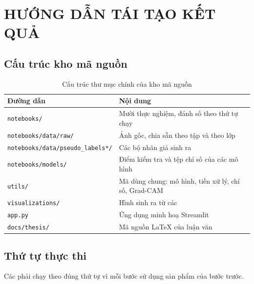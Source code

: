\chapter{HƯỚNG DẪN TÁI TẠO KẾT QUẢ}
\label{app:D}

\section{Cấu trúc kho mã nguồn}

\begin{table}[H]
\centering
\caption{Cấu trúc thư mục chính của kho mã nguồn}
\label{tab:app_repo}
\begin{tabular}{L{5.2cm} L{7.8cm}}
\toprule
\textbf{Đường dẫn} & \textbf{Nội dung} \\
\midrule
\texttt{notebooks/} & Mười  thực nghiệm, đánh số theo thứ tự chạy \\
\texttt{notebooks/\allowbreak data/\allowbreak raw/} & Ảnh gốc, chia sẵn theo tập và theo lớp \\
\texttt{notebooks/\allowbreak data/\allowbreak pseudo\_\allowbreak labels*/} & Các bộ nhãn giả sinh ra \\
\texttt{notebooks/\allowbreak models/} & Điểm kiểm tra và tệp chỉ số của các mô hình \\
\texttt{utils/} & Mã dùng chung: mô hình, tiền xử lý, chỉ số, Grad-CAM \\
\texttt{visualizations/} & Hình sinh ra từ các  \\
\texttt{app.py} & Ứng dụng minh hoạ Streamlit \\
\texttt{docs/thesis/} & Mã nguồn LaTeX của luận văn \\
\bottomrule
\end{tabular}
\end{table}

\section{Thứ tự thực thi}

Các  phải chạy theo đúng thứ tự vì mỗi bước sử dụng sản phẩm của bước
trước.

